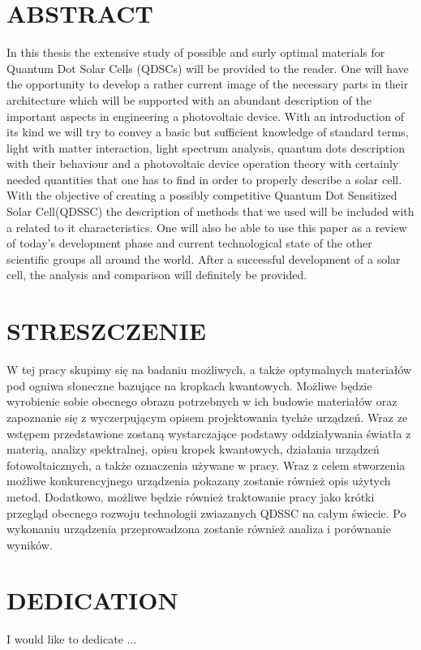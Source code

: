 \documentclass[12pt,twoside]{report}
\numberwithin{equation}{subsection}
\begin{document}
\graphicspath{ {images/} }



\chapter*{\textbf{ABSTRACT}}
In this thesis the extensive study of possible and surly optimal materials for Quantum Dot Solar Cells (QDSCs) will be provided to the reader. One will have the opportunity to develop a rather current image of the necessary parts in their architecture which will be supported with an abundant description of the important aspects in engineering a photovoltaic device. With an introduction of its kind we will try to convey a basic but sufficient knowledge of standard terms, light with matter interaction, light spectrum analysis, quantum dots description with their behaviour and a photovoltaic device operation theory with certainly needed quantities that one has to find in order to properly describe a solar cell. With the objective of creating a possibly competitive Quantum Dot Sensitized Solar Cell(QDSSC) the description of methods that we used will be included with a related to it characteristics. One will also be able to use this paper as a review of today's development phase and current technological state of the other scientific groups all around the world.  After a successful development of a solar cell, the analysis and comparison will definitely be provided.

\chapter*{STRESZCZENIE}

W tej pracy skupimy się na badaniu możliwych, a także optymalnych materiałów pod ogniwa słoneczne bazujące na kropkach kwantowych. Możliwe będzie wyrobienie sobie obecnego obrazu potrzebnych w ich budowie materiałów oraz zapoznanie się z wyczerpującym opisem projektowania tychże urządzeń. Wraz ze wstępem przedstawione zostaną wystarczające podstawy oddziaływania światła z materią, analizy spektralnej, opisu kropek kwantowych, działania urządzeń fotowoltaicznych, a także oznaczenia używane w pracy. Wraz z celem stworzenia możliwe konkurencyjnego urządzenia pokazany zostanie również opis użytych metod. Dodatkowo, możliwe będzie również traktowanie pracy jako krótki przegląd obecnego rozwoju technologii zwiazanych QDSSC na całym świecie. Po wykonaniu urządzenia przeprowadzona zostanie również analiza i porównanie wyników.
 
\chapter*{DEDICATION}
I would like to dedicate ...
\end{document}
